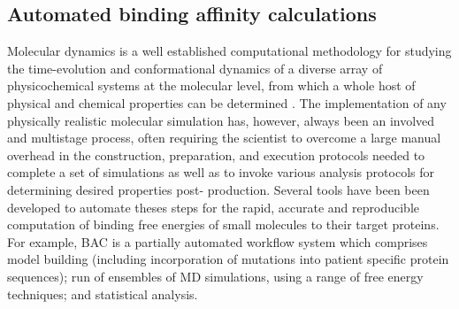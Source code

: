 

\subsection{Automated binding affinity calculations}

Molecular dynamics is a well established computational methodology for
studying the time-evolution and conformational dynamics of a diverse array of
physicochemical systems at the molecular level, from which a whole host of
physical and chemical properties can be determined \cite{Karplus2005}. The
implementation of any physically realistic molecular simulation has, however,
always been an involved and multistage process, often requiring the scientist
to overcome a large manual overhead in the construction, preparation, and
execution protocols needed to complete a set of simulations as well as to
invoke various analysis protocols for determining desired properties post-
production. Several tools have been been developed to automate theses steps
for the rapid, accurate and reproducible computation of binding free energies
of small molecules to their target proteins. For example, BAC\cite{Sadiq2008}
is a partially automated workflow system which comprises model building
(including incorporation of mutations into patient specific protein
sequences); run of ensembles of MD simulations, using a range of free energy
techniques; and statistical analysis.


